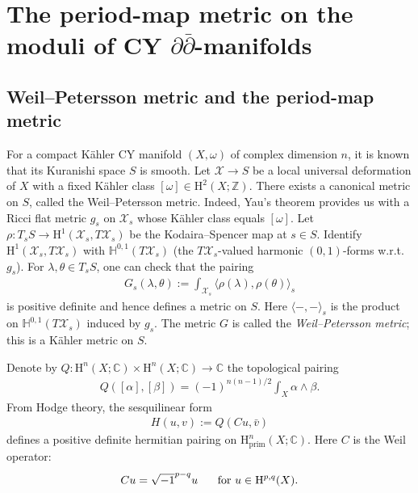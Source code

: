 \section{The period-map metric
on the moduli of CY \texorpdfstring{\(\partial\bar{\partial}\)}{ddbar}-manifolds}

\subsection{Weil--Petersson metric and the period-map metric}
For a compact K\"{a}hler CY manifold \((X,\omega)\) 
of complex dimension \(n\), it is known that
its Kuranishi space \(S\) is smooth. 
Let \(\mathcal{X}\to S\)
be a local universal deformation of \(X\) 
with a fixed K\"{a}hler class \([\omega]\in \mathrm{H}^{2}(X;\mathbb{Z})\).
There exists a canonical metric on \(S\), called
the Weil--Petersson metric. Indeed,
Yau's theorem 
\cite{1978-Yau-on-the-ricci-curvature-of-a-compact-kahler-manifold-and-the-complex-monge-ampere-equation-i}
provides us with a Ricci flat metric \(g_{s}\)
on \(\mathcal{X}_{s}\) whose K\"{a}hler class 
equals \([\omega]\).
Let
\(\rho\colon T_{s}S\to\mathrm{H}^{1}(\mathcal{X}_{s},T\mathcal{X}_{s})\) 
be the Kodaira--Spencer map at \(s\in S\). 
Identify \(\mathrm{H}^{1}(\mathcal{X}_{s},T\mathcal{X}_{s})\) 
with \(\mathbb{H}^{0,1}(T\mathcal{X}_{s})\)
(the \(T\mathcal{X}_{s}\)-valued harmonic \((0,1)\)-forms w.r.t.~\(g_{s}\)).
For \(\lambda,\theta\in T_{s}S\),
one can check that the pairing
\begin{eqnarray*}
G_{s}(\lambda,\theta):=\int_{\mathcal{X}_{s}} \langle\rho(\lambda),\rho(\theta)\rangle_{s}
\end{eqnarray*}
is positive definite and hence defines a metric on \(S\).
Here \(\langle-,-\rangle_{s}\) is the product
on \(\mathbb{H}^{0,1}(T\mathcal{X}_{s})\) induced by \(g_{s}\). 
The metric \(G\) is called the \emph{Weil--Petersson metric};
this is a K\"{a}hler metric on \(S\).

Denote by \(Q\colon\mathrm{H}^{n}(X;\mathbb{C})\times
\mathrm{H}^{n}(X;\mathbb{C})\to\mathbb{C}\) the topological pairing
\begin{eqnarray}
\label{eq:topological-pairing}
Q([\alpha],[\beta]) = (-1)^{n(n-1)/2}\int_{X}\alpha\wedge\beta.
\end{eqnarray}
From Hodge theory, the sesquilinear form
\begin{eqnarray}
\label{eq:sesuilinear-pairing-kahler}
H(u,v):=Q(Cu,\bar{v})
\end{eqnarray}
defines a positive definite hermitian 
pairing on \(\mathrm{H}^{n}_{\mathrm{prim}}(X;\mathbb{C})\).
Here \(C\) is the Weil operator: 
\begin{eqnarray*}
Cu=\sqrt{-1}^{p-q}u~\hspace{0.5cm}\mbox{for}~u\in\mathrm{H}^{p,q}(X).
\end{eqnarray*}

